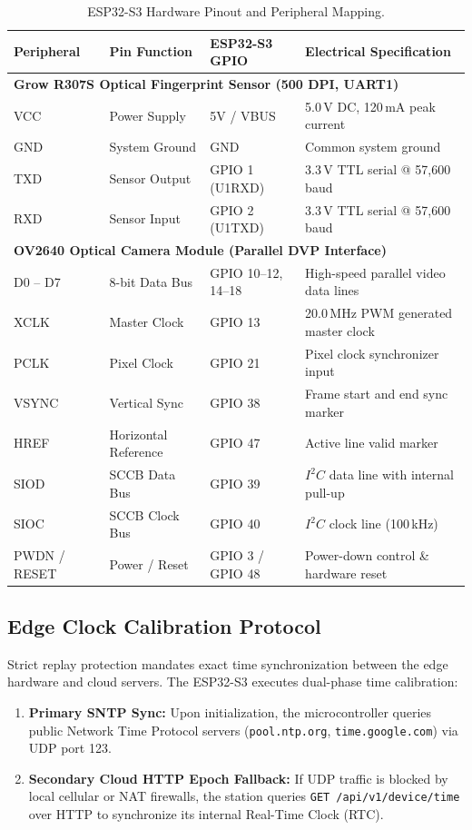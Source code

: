 \documentclass[11pt,a4paper]{article}
\begin{document}
\begin{table}[htbp]
\centering
\small
\caption{ESP32-S3 Hardware Pinout and Peripheral Mapping.}
\label{tab:pinout}
\begin{tabularx}{\textwidth}{l l l X}
\toprule
\textbf{Peripheral} & \textbf{Pin Function} & \textbf{ESP32-S3 GPIO} & \textbf{Electrical Specification} \\
\midrule
\multicolumn{4}{l}{\textbf{Grow R307S Optical Fingerprint Sensor (500 DPI, UART1)}} \\
\midrule
VCC & Power Supply & 5V / VBUS & 5.0\,V DC, 120\,mA peak current \\
GND & System Ground & GND & Common system ground \\
TXD & Sensor Output & GPIO 1 (U1RXD) & 3.3\,V TTL serial @ 57,600 baud \\
RXD & Sensor Input & GPIO 2 (U1TXD) & 3.3\,V TTL serial @ 57,600 baud \\
\midrule
\multicolumn{4}{l}{\textbf{OV2640 Optical Camera Module (Parallel DVP Interface)}} \\
\midrule
D0 -- D7 & 8-bit Data Bus & GPIO 10--12, 14--18 & High-speed parallel video data lines \\
XCLK & Master Clock & GPIO 13 & 20.0\,MHz PWM generated master clock \\
PCLK & Pixel Clock & GPIO 21 & Pixel clock synchronizer input \\
VSYNC & Vertical Sync & GPIO 38 & Frame start and end sync marker \\
HREF & Horizontal Reference & GPIO 47 & Active line valid marker \\
SIOD & SCCB Data Bus & GPIO 39 & $I^2C$ data line with internal pull-up \\
SIOC & SCCB Clock Bus & GPIO 40 & $I^2C$ clock line (100\,kHz) \\
PWDN / RESET & Power / Reset & GPIO 3 / GPIO 48 & Power-down control \& hardware reset \\
\bottomrule
\end{tabularx}
\end{table}

\subsection{Edge Clock Calibration Protocol}
Strict replay protection mandates exact time synchronization between the edge hardware and cloud servers. The ESP32-S3 executes dual-phase time calibration:
\begin{enumerate}
    \item \textbf{Primary SNTP Sync:} Upon initialization, the microcontroller queries public Network Time Protocol servers (\texttt{pool.ntp.org}, \texttt{time.google.com}) via UDP port 123.
    \item \textbf{Secondary Cloud HTTP Epoch Fallback:} If UDP traffic is blocked by local cellular or NAT firewalls, the station queries \texttt{GET /api/v1/device/time} over HTTP to synchronize its internal Real-Time Clock (RTC).
\end{enumerate}
\end{document}
